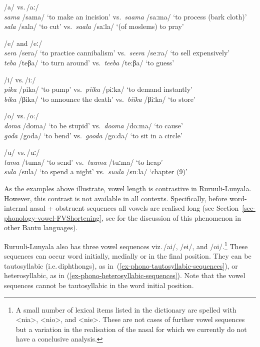 \ea \label{ex-phono-vowels-long}
\begin{xlist}	
\ex /a/ vs.\,/aː/\\
 \textit{sama} /sama/  ‘to make an incision’ vs.\, \textit{saama} /saːma/  ‘to process (bark cloth)’\\
 \textit{sala} /sala/  ‘to cut’ vs.\, \textit{saala} /saːla/ ‘(of moslems) to pray’ 

\ex /e/ and /eː/\\
 \textit{sera} /sera/  ‘to practice cannibalism' vs.\, \textit{seera} /seːra/  ‘to sell expensively’\\
  \textit{teba} /teβa/ ‘to turn around’ vs.\, \textit{teeba} /teːβa/  ‘to guess’
		
\ex /i/ vs.\,/iː/\\
 \textit{pika} /pika/  ‘to pump’ vs.\, \textit{piika} /piːka/ ‘to demand instantly’\\
  \textit{bika} /βika/  ‘to announce the death’ vs.\,  \textit{biika} /βiːka/ ‘to store’

\ex /o/ vs.\,/oː/\\
  \textit{doma} /doma/ ‘to be stupid’ vs.\, \textit{dooma} /doːma/  ‘to cause’\\
 \textit{goda} /goda/  ‘to bend’ vs.\,  \textit{gooda}  /goːda/ ‘to sit in a circle’

\ex /u/ vs.\,/uː/\\	
 \textit{tuma}  /tuma/  ‘to send’ vs.\, \textit{tuuma} /tuːma/  ‘to heap’\\
 \textit{sula} /sula/  ‘to spend a night’ vs.\, \textit{suula}  /suːla/  ‘chapter (9)’
\end{xlist}	
\z

As the examples above illustrate, vowel length is contrastive in Ru\-ruu\-li\hyp{}Lu\-nya\-la. However, this contrast is not  available in all contexts. 
Specifically, before word-internal nasal + obstruent sequences all vowels are realised long (see Section~\ref{sec-phonology-vowel-FVShortening}, see \citealt{Hyman1992Moraic, Downing2005Ambiguous} for the discussion of this phenomenon in other Bantu languages).

Ruruuli-Lunyala also has three vowel sequences viz.\,/ai/, /ei/, and /oi/.\footnote{A small number of lexical items listed in the dictionary are spelled with <nia>, <nio>, and <nie>. These are not cases of further vowel sequences but a variation in the realisation of the nasal for which we currently do not have a conclusive analysis.} 
These sequences can occur word initially, medially or in the final position. 
They can be tautosyllabic (i.e.\,diphthongs), as in~(\ref{ex-phono-tautosyllabic-sequences}), or heterosyllabic, as in (\ref{ex-phono-heterosyllabic-sequences}). 
Note that the vowel sequences cannot be tautosyllabic in the word initial position. 


